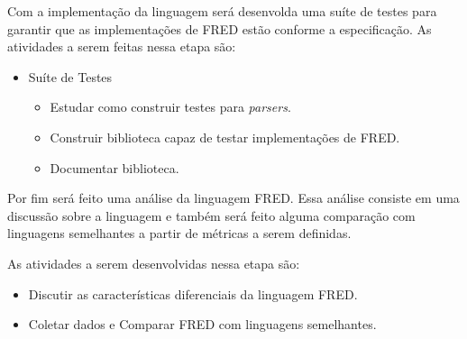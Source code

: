 Com a implementação da linguagem será desenvolda uma suíte de testes para garantir 
que as implementações de FRED estão conforme a especificação. As atividades a serem
feitas nessa etapa são:

\begin{itemize}
    \item Suíte de Testes
    \begin{itemize}
        \item Estudar como construir testes para \textit{parsers}.
        \item Construir biblioteca capaz de testar implementações de FRED.
        \item Documentar biblioteca.
    \end{itemize}
\end{itemize}

Por fim será feito uma análise da linguagem FRED. Essa análise consiste 
em uma discussão sobre a linguagem e também será feito alguma comparação
com linguagens semelhantes a partir de métricas a serem definidas.

As  atividades a serem desenvolvidas nessa etapa são:

\begin{itemize}
    \item Discutir as características diferenciais da linguagem FRED.
    \item Coletar dados e Comparar FRED com linguagens semelhantes.
\end{itemize}
